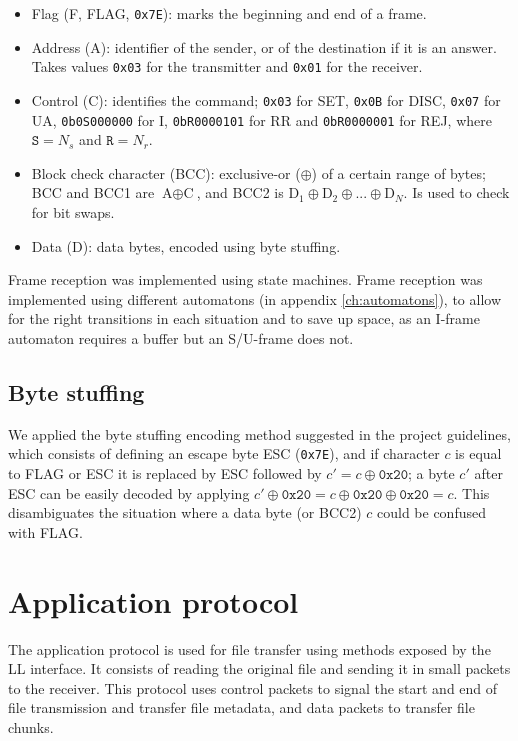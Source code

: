 \documentclass[a4paper, 11pt]{report}
\newcommand*\xor{\oplus}
\begin{document}
\begin{itemize}
	\itemsep0em
	\item Flag (F, FLAG, \texttt{0x7E}): marks the beginning and end of a frame.
	\item Address (A): identifier of the sender, or of the destination if it is an answer. Takes values \texttt{0x03} for the transmitter and \texttt{0x01} for the receiver.
	\item Control (C): identifies the command; \texttt{0x03} for SET, \texttt{0x0B} for DISC, \texttt{0x07} for UA, \texttt{0b0S000000} for I, \texttt{0bR0000101} for RR and \texttt{0bR0000001} for REJ, where $\texttt{S} = N_s$ and $\texttt{R} = N_r$.
	\item Block check character (BCC): exclusive-or ($\xor$) of a certain range of bytes; BCC and BCC1 are $\text{A}\xor\text{C}$, and BCC2 is $\text{D}_1 \xor \text{D}_2 \xor ... \xor \text{D}_N$. Is used to check for bit swaps.
	\item Data (D): data bytes, encoded using byte stuffing.
\end{itemize}

Frame reception was implemented using state machines. Frame reception was implemented using different automatons (in appendix \ref{ch:automatons}), to allow for the right transitions in each situation and to save up space, as an I-frame automaton requires a buffer but an S/U-frame does not.

\subsection{Byte stuffing}

We applied the byte stuffing encoding method suggested in the project guidelines, which consists of defining an escape byte ESC (\texttt{0x7E}), and if character $c$ is equal to FLAG or ESC it is replaced by ESC followed by $c' = c \xor \texttt{0x20}$; a byte $c'$ after ESC can be easily decoded by applying $c' \xor \texttt{0x20} = c \xor \texttt{0x20} \xor \texttt{0x20} = c$. This disambiguates the situation where a data byte (or BCC2) $c$ could be confused with FLAG.

\section{Application protocol} \label{sec:AppProtocol}

The application protocol is used for file transfer using methods exposed by the LL interface. It consists of reading the original file and sending it in small packets to the receiver. This protocol uses control packets to signal the start and end of file transmission and transfer file metadata, and data packets to transfer file chunks.
\end{document}
